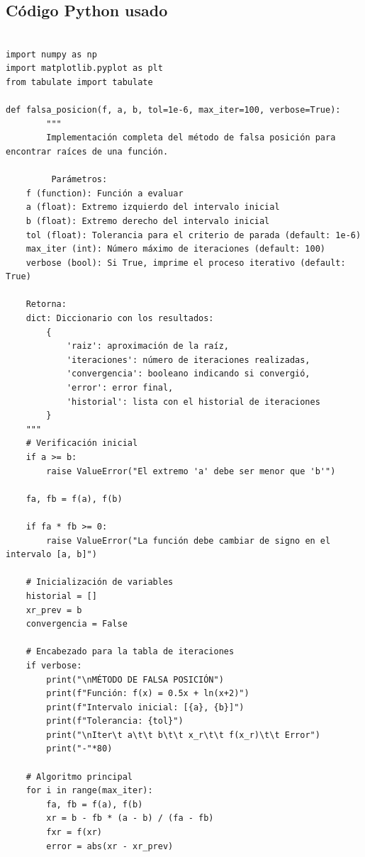 \documentclass[12pt]{article}
\begin{document}
\begin{center}
\section*{Código Python usado}

\begin{tcolorbox}[title=Codigo python,
                  colback=white,
                  colframe=black,
                  breakable, enhanced]
\begin{lstlisting}[style=mypython]

import numpy as np
import matplotlib.pyplot as plt
from tabulate import tabulate

def falsa_posicion(f, a, b, tol=1e-6, max_iter=100, verbose=True):
        """
        Implementación completa del método de falsa posición para encontrar raíces de una función.
    
         Parámetros:
    f (function): Función a evaluar
    a (float): Extremo izquierdo del intervalo inicial
    b (float): Extremo derecho del intervalo inicial
    tol (float): Tolerancia para el criterio de parada (default: 1e-6)
    max_iter (int): Número máximo de iteraciones (default: 100)
    verbose (bool): Si True, imprime el proceso iterativo (default: True)
    
    Retorna:
    dict: Diccionario con los resultados:
        {
            'raiz': aproximación de la raíz,
            'iteraciones': número de iteraciones realizadas,
            'convergencia': booleano indicando si convergió,
            'error': error final,
            'historial': lista con el historial de iteraciones
        }
    """
    # Verificación inicial
    if a >= b:
        raise ValueError("El extremo 'a' debe ser menor que 'b'")
    
    fa, fb = f(a), f(b)
    
    if fa * fb >= 0:
        raise ValueError("La función debe cambiar de signo en el intervalo [a, b]")
    
    # Inicialización de variables
    historial = []
    xr_prev = b
    convergencia = False
    
    # Encabezado para la tabla de iteraciones
    if verbose:
        print("\nMÉTODO DE FALSA POSICIÓN")
        print(f"Función: f(x) = 0.5x + ln(x+2)")
        print(f"Intervalo inicial: [{a}, {b}]")
        print(f"Tolerancia: {tol}")
        print("\nIter\t a\t\t b\t\t x_r\t\t f(x_r)\t\t Error")
        print("-"*80)
    
    # Algoritmo principal
    for i in range(max_iter):
        fa, fb = f(a), f(b)
        xr = b - fb * (a - b) / (fa - fb)
        fxr = f(xr)
        error = abs(xr - xr_prev)
        

\end{lstlisting}
\end{tcolorbox}
\end{center}
\end{document}
